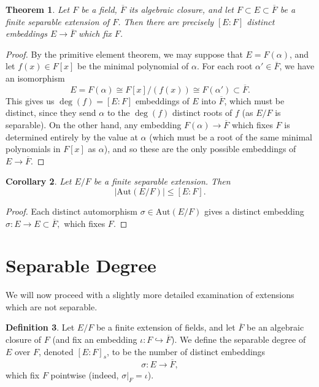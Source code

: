 \documentclass[12pt]{report}
\newtheorem{theorem}{Theorem}[section]
\newtheorem{corollary}[theorem]{Corollary}
\theoremstyle{definition}
\newtheorem{definition}[theorem]{Definition}
\newcommand{\Aut}{\text{Aut}}
\begin{document}
\begin{theorem}\label{acc}
	Let $F$ be a field, $\overline{F}$ its algebraic closure, and let $F \subset E \subset \overline{F}$ be a finite separable extension of $F$. Then there are precisely $[E:F]$ distinct embeddings $E\to \overline{F}$ which fix $F$.
\end{theorem}

\begin{proof}
	By the primitive element theorem, we may suppose that $E = F(\alpha)$, and let $f(x) \in F[x]$ be the minimal polynomial of $\alpha$. For each root $\alpha' \in \overline{F}$, we have an isomorphism $$E = F(\alpha) \cong F[x]/(f(x)) \cong F(\alpha') \subset \overline{F}.$$
	This gives us $\deg(f) = [E:F]$ embeddings of $E$ into $\overline{F}$, which must be distinct, since they send $\alpha$ to the $\deg(f)$ distinct roots of $f$ (as $E/F$ is separable).
	On the other hand, any embedding $F(\alpha) \to \overline{F}$ which fixes $F$ is determined entirely by the value at $\alpha$ (which must be a root of the same minimal polynomials in $F[x]$ as $\alpha$), and so these are the only possible embeddings of $E \to \overline{F}$.
\end{proof}

\begin{corollary}\label{cor1}
	Let $E/F$ be a finite separable extension. Then
	$$|\Aut(E/F)| \leq [E:F].$$
\end{corollary}

\begin{proof}
	Each distinct automorphism $\sigma\in\Aut(E/F)$ gives a distinct embedding $\sigma : E \to E \subset \overline{F},$ which fixes $F$.
\end{proof}

\section{Separable Degree}

We will now proceed with a slightly more detailed examination of extensions which are not separable.

\begin{definition}
	Let $E/F$ be a finite extension of fields, and let $\overline{F}$ be an algebraic closure of $F$ (and fix an embedding $\iota: F\hookrightarrow\overline{F}$). We define the separable degree of $E$ over $F$, denoted $[E : F]_s$, to be the number of distinct embeddings $$\sigma: E\to \overline{F},$$ which fix $F$ pointwise (indeed, $\sigma|_F=\iota$).
\end{definition}
\end{document}
